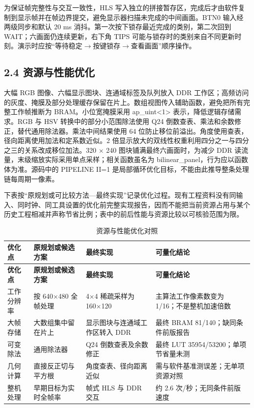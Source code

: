 \documentclass[UTF8,fontset=windows,a4paper,11pt]{ctexart}
\begin{document}
为保证帧完整性与交互一致性，HLS 写入独立的拼接暂存区，完成后才由软件复制到显示帧并在帧边界提交，避免显示器扫描未完成的中间画面。BTN0 输入经两级同步和默认 20 ms 消抖。第一次按下锁存最近完成的类别，第二次回到 WAIT；六画面仍连续更新，右下角 TIPS 可能与锁存时的类别来自不同更新时刻。演示时应按“等待稳定$\rightarrow$按键锁存$\rightarrow$查看画面”顺序操作。\par

\subsection*{2.4 资源与性能优化}

大幅 RGB 图像、六幅显示图块、连通域标签及队列放入 DDR 工作区；高频访问的灰度、掩膜及部分处理缓存保留在片上。数组视图传入辅助函数，避免把所有完整工作帧推断为 BRAM。小位宽掩膜采用 ap\_uint<1> 表示，降低逻辑存储需求。RGB 与 HSV 转换中的部分小范围除法使用 Q24 倒数查表、乘法和余数修正，替代通用除法器。乘法中间结果使用 64 位防止移位前溢出。角度使用查表，径向距离使用加法和定系数近似。2 倍显示放大的双线性权重利用四分之一与四分之三的关系改成移位加法。320 × 240 图块铺满最终六画面时，为减少 DDR 读流量，末级缩放实际采用单点采样；相关函数虽名为 bilinear\_panel，行为应以函数体为准。源码中的 PIPELINE II=1 是局部循环优化目标，不能由此推导整条处理链每周期一像素。\par

下表按“原规划或可比较方法—最终实现”记录优化过程。现有工程资料没有同输入、同时钟、同工具设置的优化前完整实现报告，因而不能把当前资源占用与某个历史工程相减并声称节省比例；表中的前后性能与资源比较以可核验范围为限。\par

\begin{center}
\begingroup
\fontsize{8.5}{11}\selectfont
\setlength{\tabcolsep}{3pt}
\renewcommand{\arraystretch}{1.22}
\begin{longtable}{@{}p{2.269cm}p{3.591cm}p{3.970cm}p{3.970cm}@{}}
\caption{资源与性能优化对照}\\
\toprule
\textbf{优化点} & \textbf{原规划或候选方案} & \textbf{最终实现} & \textbf{可量化结论} \\
\midrule
\endfirsthead
\toprule
\textbf{优化点} & \textbf{原规划或候选方案} & \textbf{最终实现} & \textbf{可量化结论} \\
\midrule
\endhead
\bottomrule
\endfoot
工作分辨率 & 按 640×480 全帧处理 & 4×4 稀疏采样为 160×120 & 主算法工作像素数变为 1/16；不是整机加速倍数 \\
大帧存储 & 大数组集中留在片上 & 显示图块与连通域工作区转入 DDR & 最终 BRAM 81/140；缺同条件前版报告 \\
可变除法 & 通用除法器 & Q24 倒数查表及余数修正 & 最终 LUT 35954/53200；单项节省量未测 \\
几何计算 & 直接反正切与平方根 & 角度查表、径向距离近似 & 需与软件基准测误差；无单项资源对照 \\
整机处理 & 早期目标为实时全帧率 & 帧式 HLS 与 DDR 交互 & 约 2.6 次/秒；无同条件前版速度 \\
\end{longtable}
\endgroup
\end{center}
\end{document}
